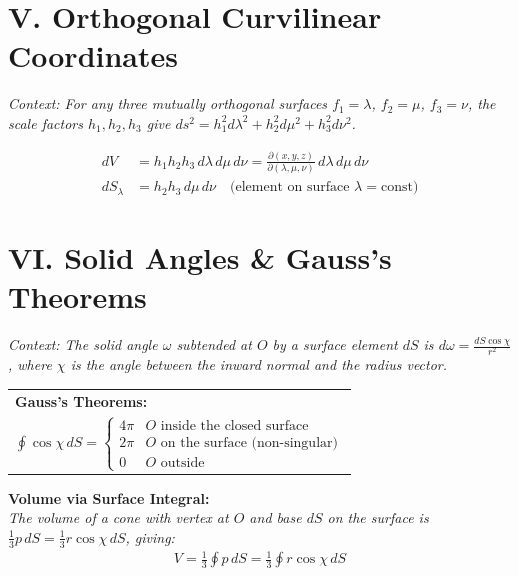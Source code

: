 \documentclass[11pt, a4paper]{article}
\begin{document}
\vspace{0.3cm}

\section*{\color{primary} V. Orthogonal Curvilinear Coordinates}

\textit{\small Context: For any three mutually orthogonal surfaces $f_1=\lambda$, $f_2=\mu$, $f_3=\nu$, the scale factors $h_1, h_2, h_3$ give $ds^2 = h_1^2 d\lambda^2 + h_2^2 d\mu^2 + h_3^2 d\nu^2$.}

\begin{align*}
    dV &= h_1 h_2 h_3\,d\lambda\,d\mu\,d\nu = \frac{\partial(x,y,z)}{\partial(\lambda,\mu,\nu)}\,d\lambda\,d\mu\,d\nu \\
    dS_\lambda &= h_2 h_3\,d\mu\,d\nu \quad \text{(element on surface $\lambda=\text{const}$)}
\end{align*}

\vspace{0.3cm}

\section*{\color{primary} VI. Solid Angles \& Gauss's Theorems}

\textit{\small Context: The solid angle $\omega$ subtended at $O$ by a surface element $dS$ is $d\omega = \frac{dS \cos\chi}{r^2}$, where $\chi$ is the angle between the inward normal and the radius vector.}

\begin{center}
\begin{tabular}{@{}p{}@{}}
\toprule
\textbf{\color{accent}Gauss's Theorems:} \\
$\displaystyle\oint \cos\chi\,dS = \begin{cases} 4\pi & O \text{ inside the closed surface} \\ 2\pi & O \text{ on the surface (non-singular)} \\ 0 & O \text{ outside} \end{cases}$ \\
\bottomrule
\end{tabular}
\end{center}

\vspace{0.2cm}

\textbf{\color{accent}Volume via Surface Integral:}\\
\textit{\small The volume of a cone with vertex at $O$ and base $dS$ on the surface is $\frac{1}{3}p\,dS = \frac{1}{3}r\cos\chi\,dS$, giving:}
\begin{align*}
    V = \frac{1}{3}\oint p\,dS = \frac{1}{3}\oint r\cos\chi\,dS
\end{align*}
\end{document}
